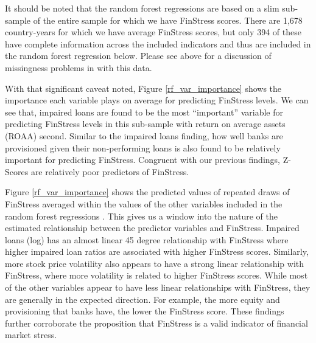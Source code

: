 \documentclass[]{article}
\begin{document}
It should be noted that the random forest regressions are based on a slim sub-sample of the entire sample for which we have FinStress scores. There are 1,678 country-years for which we have average FinStress scores, but only 394 of these have complete information across the included indicators and thus are included in the random forest regression below. Please see above for a discussion of missingness problems in with this data.

With that significant caveat noted, Figure \ref{rf_var_importance} shows the importance each variable plays on average for predicting FinStress levels. We can see that, impaired loans are found to be the most ``important'' variable for predicting FinStress levels in this sub-sample with return on average assets (ROAA) second. Similar to the impaired loans finding, how well banks are provisioned given their non-performing loans is also found to be relatively important for predicting FinStress. Congruent with our previous findings, Z-Scores are relatively poor predictors of FinStress.

Figure \ref{rf_var_importance} shows the predicted values of repeated draws of FinStress averaged within the values of the other variables included in the random forest regressions \citep[14]{jones2015}. This gives us a window into the nature of the estimated relationship between the predictor variables and FinStress. Impaired loans (log) has an almost linear 45 degree relationship with FinStress where higher impaired loan ratios are associated with higher FinStress scores. Similarly, more stock price volatility also appears to have a strong linear relationship with FinStress, where more volatility is related to higher FinStress scores. While most of the other variables appear to have less linear relationships with FinStress, they are generally in the expected direction. For example, the more equity and provisioning that banks have, the lower the FinStress score. These findings further corroborate the proposition that FinStress is a valid indicator of financial market stress.
\end{document}
